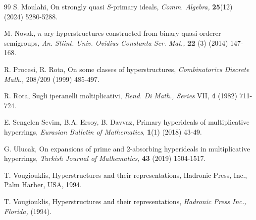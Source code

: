\documentclass[preprint,review,10pt]{amsart}
\theoremstyle{definition}
\theoremstyle{remark}
\numberwithin{equation}{section}
\begin{document}
\begin{thebibliography}{99}
S. Moulahi, On strongly quasi $S$-primary ideals, {\it Comm. Algebra,} {\bf 25}(12) (2024) 5280-5288.




M. Novak, $n$-ary hyperstructures constructed from binary quasi-orderer semigroups, {\it An. Stiint. Univ. Ovidius Constanta Ser. Mat.,} {\bf 22} (3)
(2014) 147-168.

R. Procesi, R. Rota, On some classes of hyperstructures, {\it Combinatorics
Discrete Math.,} 208/209 (1999) 485-497.


R. Rota, Sugli iperanelli moltiplicativi, {\it Rend. Di Math., Series} VII, {\bf 4} (1982) 711-724.

E. Sengelen Sevim, B.A. Ersoy,  B. Davvaz, Primary hyperideals of multiplicative hyperrings, {\it Eurasian Bulletin of Mathematics}, {\bf 1}(1) (2018) 43-49.



G. Ulucak, On expansions of prime and 2-absorbing hyperideals in multiplicative hyperrings, {\it Turkish Journal of Mathematics,} {\bf 43} (2019) 1504-1517.


T. Vougiouklis, Hyperstructures and their representations, Hadronic Press, Inc., Palm Harber, USA, 1994.


T. Vougiouklis, Hyperstructures and their representations, {\it Hadronic Press Inc., Florida, }(1994).





\end{thebibliography}
\end{document}
